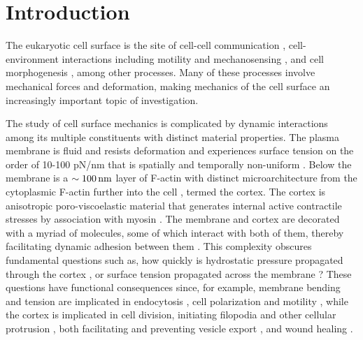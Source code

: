 
\section*{Introduction}



The eukaryotic cell surface is the site of cell-cell communication \cite{Allard:2012gy}, cell-environ\-ment interactions including motility and mechanosensing \cite{Zhu:2013kq}, and cell morphogenesis \cite{Allard:2012if}, among other processes. Many of these processes involve mechanical forces and deformation, making mechanics of the cell surface an increasingly important topic of investigation.

The study of cell surface mechanics is complicated by dynamic interactions among its multiple constituents with distinct material properties. 
The plasma membrane is fluid \cite{Rangamani:2013ce} and resists deformation and experiences surface tension on the order of 10-100 pN/nm \cite{Tinevez:2009bh} that is spatially and temporally non-uniform \cite{Peleg:2011fz}. 
Below the membrane is a $\sim100\,\mbox{nm}$ layer of F-actin with distinct microarchitecture from the cytoplasmic F-actin further into the cell \cite{Clark:2013ef}, termed the cortex. The cortex is anisotropic poro-viscoelastic material \cite{Salbreux:2009fp,Hannezo:2015ba} that generates internal active contractile stresses by association with myosin \cite{Tinevez:2009bh}. 
The membrane and cortex are decorated with a myriad of molecules, some of which interact with both of them, thereby facilitating dynamic adhesion between them \cite{Fritzsche:2014jw}.   
This complexity obscures fundamental questions such as, how quickly is hydrostatic pressure propagated through the cortex \cite{Strychalski:2013eo,Charras:2009dp,Clark:2014fj}, or surface tension propagated across the membrane \cite{Peleg:2011fz,BenFogelson:2014gx,Rangamani:2013ce}?
These questions have functional consequences since, for example, membrane bending and tension are implicated in endocytosis \cite{Liu:2010hla}, cell polarization \cite{Weiner:2007gd} and motility \cite{BenFogelson:2014gx, Yip:2015cb}, while the cortex is implicated in cell division, initiating filopodia and other cellular protrusion \cite{Leijnse:2015fd},  both facilitating and preventing vesicle export \cite{Wollman:2012kha},  and wound healing \cite{Salbreux:2009fp}. 
 

